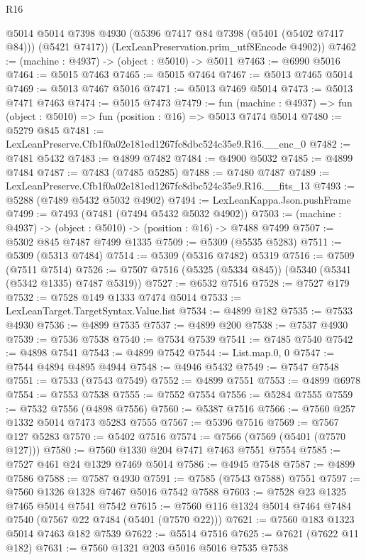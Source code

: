 \begin{lexlean}{R16}
\begin{coremodule}
        @5014
        @5014
        @7398
        @4930
        (@5396 @7417 @84 @7398 (@5401 (@5402 @7417 @84)))
        (@5421 @7417))
      (LexLeanPreservation.prim_utf8Encode @4902))
@7462 := (machine : @4937) -> (object : @5010) -> @5011
@7463 := @6990 @5016
@7464 := @5015 @7463
@7465 := @5015 @7464
@7467 := @5013 @7465 @5014
@7469 := @5013 @7467 @5016
@7471 := @5013 @7469 @5014
@7473 := @5013 @7471 @7463
@7474 := @5015 @7473
@7479 := fun (machine : @4937) => fun (object : @5010) => fun (position : @16) => @5013 @7474 @5014
@7480 := @5279 @845
@7481 := LexLeanPreserve.Cfb1f0a02e181ed1267fc8dbc524c35e9.R16.__enc_0
@7482 := @7481 @5432
@7483 := @4899 @7482
@7484 := @4900 @5032
@7485 := @4899 @7484
@7487 := @7483 (@7485 @5285)
@7488 := @7480 @7487
@7489 := LexLeanPreserve.Cfb1f0a02e181ed1267fc8dbc524c35e9.R16.__fits_13
@7493 := @5288 (@7489 @5432 @5032 @4902)
@7494 := LexLeanKappa.Json.pushFrame
@7499 := @7493 (@7481 (@7494 @5432 @5032 @4902))
@7503 := (machine : @4937) -> (object : @5010) -> (position : @16) -> @7488 @7499
@7507 := @5302 @845 @7487 @7499 @1335
@7509 := @5309 (@5535 @5283)
@7511 := @5309 (@5313 @7484)
@7514 := @5309 (@5316 @7482) @5319
@7516 := @7509 (@7511 @7514)
@7526 := @7507 @7516 (@5325 (@5334 @845)) (@5340 (@5341 (@5342 @1335) @7487 @5319))
@7527 := @6532 @7516
@7528 := @7527 @179
@7532 := @7528 @149 @1333 @7474 @5014
@7533 := LexLeanTarget.TargetSyntax.Value.list
@7534 := @4899 @182
@7535 := @7533 @4930
@7536 := @4899 @7535
@7537 := @4899 @200
@7538 := @7537 @4930
@7539 := @7536 @7538
@7540 := @7534 @7539
@7541 := @7485 @7540
@7542 := @4898 @7541
@7543 := @4899 @7542
@7544 := List.map.{0, 0}
@7547 := @7544 @4894 @4895 @4944
@7548 := @4946 @5432
@7549 := @7547 @7548
@7551 := @7533 (@7543 @7549)
@7552 := @4899 @7551
@7553 := @4899 @6978
@7554 := @7553 @7538
@7555 := @7552 @7554
@7556 := @5284 @7555
@7559 := @7532 @7556 (@4898 @7556)
@7560 := @5387 @7516
@7566 := @7560 @257 @1332 @5014 @7473 @5283 @7555
@7567 := @5396 @7516
@7569 := @7567 @127 @5283
@7570 := @5402 @7516
@7574 := @7566 (@7569 (@5401 (@7570 @127)))
@7580 := @7560 @1330 @204 @7471 @7463 @7551 @7554
@7585 := @7527 @461 @24 @1329 @7469 @5014
@7586 := @4945 @7548
@7587 := @4899 @7586
@7588 := @7587 @4930
@7591 := @7585 (@7543 @7588) @7551
@7597 := @7560 @1326 @1328 @7467 @5016 @7542 @7588
@7603 := @7528 @23 @1325 @7465 @5014 @7541 @7542
@7615 := @7560 @116 @1324 @5014 @7464 @7484 @7540 (@7567 @22 @7484 (@5401 (@7570 @22)))
@7621 := @7560 @183 @1323 @5014 @7463 @182 @7539
@7622 := @5514 @7516
@7625 := @7621 (@7622 @11 @182)
@7631 := @7560 @1321 @203 @5016 @5016 @7535 @7538

\end{coremodule}
\end{lexlean}
